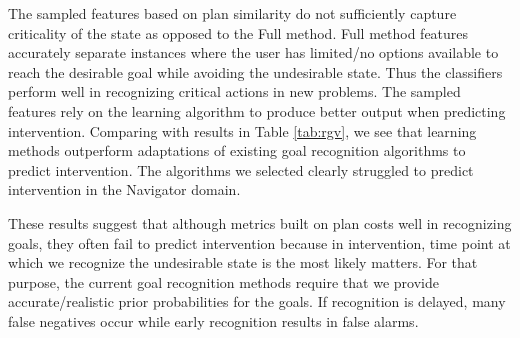 \documentclass[letterpaper]{article}
\theoremstyle{plain}
\begin{document}
The sampled features based on plan similarity do not sufficiently capture criticality of the state as opposed to  the Full method. Full method features accurately separate instances where the user has limited/no options available to reach the desirable goal while avoiding the undesirable state. Thus the classifiers perform well in recognizing critical actions in new problems. The sampled features rely on the learning algorithm to produce better output when predicting intervention. 
Comparing with results in Table \ref{tab:rgv}, we see that learning methods outperform adaptations of existing goal recognition algorithms to predict intervention. The algorithms we selected clearly struggled to predict intervention in the Navigator domain. 

These results suggest that although metrics built on plan costs well in recognizing goals, they often fail to predict intervention because in intervention, time point at which we recognize the undesirable state is the most likely matters. For that purpose, the current goal recognition methods require that we provide accurate/realistic prior probabilities for the goals. If recognition is delayed, many false negatives occur while early recognition results in false alarms.
\end{document}
